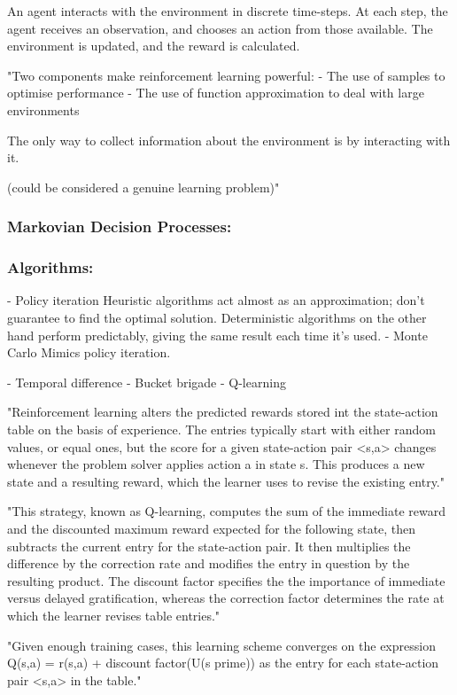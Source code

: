 \documentclass[a4paper,oneside]{report}
\begin{document}
An agent interacts with the environment in discrete time-steps. At each step, the agent receives an observation, and chooses an action from those available. The environment is updated, and the reward is calculated.

"Two components make reinforcement learning powerful: 
-	The use of samples to optimise performance 
-	The use of function approximation to deal with large environments

The only way to collect information about the environment is by interacting with it.

(could be considered a genuine learning problem)"

\subsubsection{Markovian Decision Processes:}

\subsubsection{Algorithms:}

- Policy iteration
Heuristic algorithms act almost as an approximation; don't guarantee to find the optimal solution. Deterministic algorithms on the other hand perform predictably, giving the same result each time it's used. 
- Monte Carlo
Mimics policy iteration. 

- Temporal difference
- Bucket brigade
- Q-learning

"Reinforcement learning alters the predicted rewards stored int the state-action table on the basis of experience. The entries typically start with either random values, or equal ones, but the score for a given state-action pair <s,a> changes whenever the problem solver applies action a in state s. This produces a new state and a resulting reward, which the learner uses to revise the existing entry."

"This strategy, known as Q-learning, computes the sum of the immediate reward and the discounted maximum reward expected for the following state, then subtracts the current entry for the state-action pair. It then multiplies the difference by the correction rate and modifies the entry in question by the resulting product. The discount factor specifies the the importance of immediate versus delayed gratification, whereas the correction factor determines the rate at which the learner revises table entries."

"Given enough training cases, this learning scheme converges on the expression Q(s,a) = r(s,a) + discount factor(U(s prime)) as the entry for each state-action pair <s,a> in the table."
\end{document}
